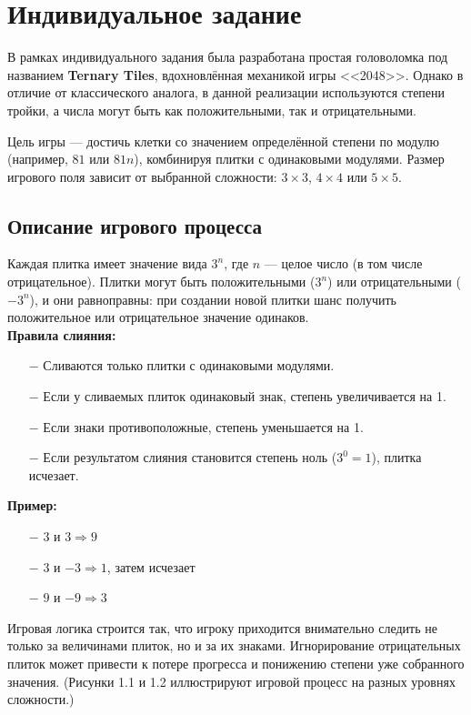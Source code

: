\documentclass[oneside,a4paper,14pt]{extarticle}
\begin{document}
\clearpage

\section{Индивидуальное задание}

В рамках индивидуального задания была разработана простая головоломка под названием \textbf{Ternary Tiles}, вдохновлённая механикой игры <<2048>>. Однако в отличие от классического аналога, в данной реализации используются степени тройки, а числа могут быть как положительными, так и отрицательными.

Цель игры — достичь клетки со значением определённой степени по модулю (например, $81$ или $81n$), комбинируя плитки с одинаковыми модулями. Размер игрового поля зависит от выбранной сложности: $3\times3$, $4\times4$ или $5\times5$.

\subsection{Описание игрового процесса}

\sloppy Каждая плитка имеет значение вида $3^n$, где $n$ — целое число (в том числе отрицательное). Плитки могут быть положительными ($3^n$) или отрицательными ($-3^n$), и они равноправны: при создании новой плитки шанс получить положительное или отрицательное значение одинаков.\\

\noindent\textbf{Правила слияния:}
\begin{itemize}
    \item[$-$] Сливаются только плитки с одинаковыми модулями.
    \item[$-$] Если у сливаемых плиток одинаковый знак, степень увеличивается на 1.
    \item[$-$] Если знаки противоположные, степень уменьшается на 1.
    \item[$-$] Если результатом слияния становится степень ноль ($3^0 = 1$), плитка исчезает.
\end{itemize}

\noindent\textbf{Пример:}
\begin{itemize}
    \item[$-$] $3$ и $3 \Rightarrow 9$
    \item[$-$] $3$ и $-3 \Rightarrow 1$, затем исчезает
    \item[$-$] $9$ и $-9 \Rightarrow 3$
\end{itemize}

Игровая логика строится так, что игроку приходится внимательно следить не только за величинами плиток, но и за их знаками. Игнорирование отрицательных плиток может привести к потере прогресса и понижению степени уже собранного значения. (Рисунки 1.1 и 1.2 иллюстрируют игровой процесс на разных уровнях сложности.)
\end{document}
